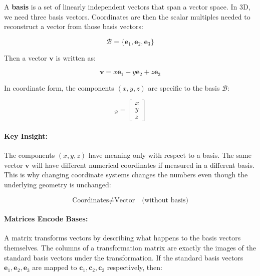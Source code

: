 \documentclass[11pt]{article}
\begin{document}
A \textbf{basis} is a set of linearly independent vectors that span a vector space. In 3D, we need three basis vectors. Coordinates are then the scalar multiples needed to reconstruct a vector from those basis vectors:

\begin{equation}
    \mathcal{B} = \{\mathbf{e}_1, \mathbf{e}_2, \mathbf{e}_3\}
\end{equation}

Then a vector $\mathbf{v}$ is written as:

\begin{equation}
    \mathbf{v} = x \mathbf{e}_1 + y \mathbf{e}_2 + z \mathbf{e}_3
\end{equation}

In coordinate form, the components $(x, y, z)$ are specific to the basis $\mathcal{B}$:

\begin{equation}
    [\mathbf{v}]_{\mathcal{B}} =
    \begin{bmatrix}
        x \\
        y \\
        z
    \end{bmatrix}
\end{equation}

\paragraph{Key Insight:}

The components $(x, y, z)$ have meaning only with respect to a basis. The same vector $\mathbf{v}$ will have different numerical coordinates if measured in a different basis. This is why changing coordinate systems changes the numbers even though the underlying geometry is unchanged:

\begin{equation}
    \text{Coordinates} \neq \text{Vector} \quad \text{(without basis)}
\end{equation}

\paragraph{Matrices Encode Bases:}

A matrix transforms vectors by describing what happens to the basis vectors themselves. The columns of a transformation matrix are exactly the images of the standard basis vectors under the transformation. If the standard basis vectors $\mathbf{e}_1, \mathbf{e}_2, \mathbf{e}_3$ are mapped to $\mathbf{c}_1, \mathbf{c}_2, \mathbf{c}_3$ respectively, then:
\end{document}

